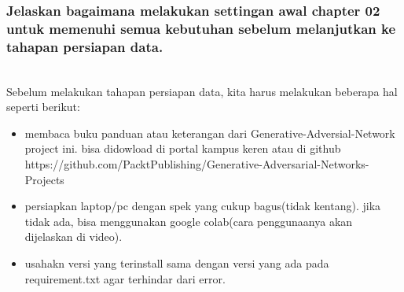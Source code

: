 \subsubsection{Jelaskan bagaimana melakukan settingan awal chapter 02 untuk memenuhi semua kebutuhan sebelum melanjutkan ke tahapan persiapan data.}
\hfill\\
Sebelum melakukan tahapan persiapan data, kita harus melakukan beberapa hal seperti berikut:
\begin{itemize}
	\item membaca buku panduan atau keterangan dari Generative-Adversial-Network project ini. bisa didowload di portal kampus keren atau di github https://github.com/PacktPublishing/Generative-Adversarial-Networks-Projects
	\item persiapkan laptop/pc dengan spek yang cukup bagus(tidak kentang). jika tidak ada, bisa menggunakan google colab(cara penggunaanya akan dijelaskan di video).
	\item usahakn versi yang terinstall sama dengan versi yang ada pada requirement.txt agar terhindar dari error.
\end{itemize}


